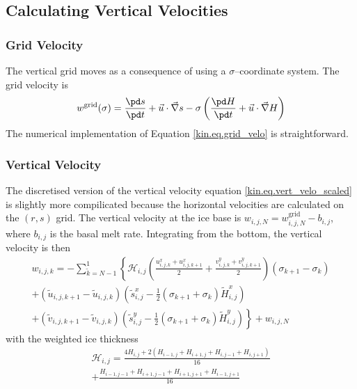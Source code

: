 \subsection{Calculating Vertical Velocities}

\subsubsection{Grid Velocity}
The vertical grid moves as a consequence of using a $\sigma$--coordinate system. The grid velocity is
\begin{equation}
  \label{kin.eq.grid_velo}
  w^{\text{grid}}(\sigma)=\frac{\pd s}{\pd t}+\vec u\cdot\vec\nabla s-\sigma\left(\frac{\pd H}{\pd t}+\vec u\cdot\vec\nabla H\right)
\end{equation}
The numerical implementation of Equation \eqref{kin.eq.grid_velo} is straightforward.

\subsubsection{Vertical Velocity}
The discretised version of the vertical velocity equation \eqref{kin.eq.vert_velo_scaled} is slightly more compilicated because the horizontal velocities are calculated on the $(r,s)$ grid. The vertical velocity at the ice base is $w_{i,j,N}=w^{\text{grid}}_{i,j,N}-b_{i,j}$, where $b_{i,j}$ is the basal melt rate. Integrating from the bottom, the vertical velocity is then
\begin{equation}
  \label{kin.eq.wvel_unc}
  \begin{split}
  w_{i,j,k}=-\sum_{\tilde{k}=N-1}^1\left\{\mathcal{H}_{i,j}\left(\frac{u^x_{i,j,k}+u^x_{i,j,k+1}}{2}+\frac{v^y_{i,j,k}+v^y_{i,j,k+1}}{2}\right)(\sigma_{k+1}-\sigma_k)\right. \\
     +(\tilde{u}_{i,j,k+1}-\tilde{u}_{i,j,k})  \left(\tilde{s}^x_{i,j}-\frac12(\sigma_{k+1}+\sigma_k)\tilde{H}^x_{i,j}\right)  \\
     \left.+(\tilde{v}_{i,j,k+1}-\tilde{v}_{i,j,k})  \left(\tilde{s}^y_{i,j}-\frac12(\sigma_{k+1}+\sigma_k)\tilde{H}^y_{i,j}\right)\right\} + w_{i,j,N}
  \end{split}
\end{equation}
with the weighted ice thickness
\begin{equation*}
  \begin{split}
  \mathcal{H}_{i,j}=\frac{4H_{i,j}+2(H_{i-1,j}+H_{i+1,j}+H_{i,j-1}+H_{i,j+1})}{16}\\
  +\frac{H_{i-1,j-1}+H_{i+1,j-1}+H_{i+1,j+1}+H_{i-1,j+1}}{16}    
  \end{split}
\end{equation*}

